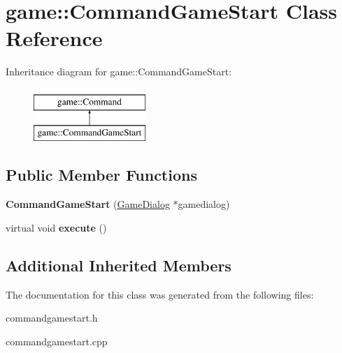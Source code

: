 \hypertarget{classgame_1_1CommandGameStart}{}\section{game\+:\+:Command\+Game\+Start Class Reference}
\label{classgame_1_1CommandGameStart}
Inheritance diagram for game\+:\+:Command\+Game\+Start\+:\begin{figure}[H]
\begin{center}
\leavevmode
\includegraphics[height=2.000000cm]{classgame_1_1CommandGameStart}
\end{center}
\end{figure}
\subsection*{Public Member Functions}
\begin{DoxyCompactItemize}
\item 
\mbox{\label{classgame_1_1CommandGameStart_a206580f2f617c056dd8ed1b3e1717eb4}} 
{\bfseries Command\+Game\+Start} (\hyperlink{classgame_1_1GameDialog}{Game\+Dialog} $\ast$gamedialog)
\item 
\mbox{\label{classgame_1_1CommandGameStart_a129ae7102d5d2ebb84e70ecb5a6ee55c}} 
virtual void {\bfseries execute} ()
\end{DoxyCompactItemize}
\subsection*{Additional Inherited Members}


The documentation for this class was generated from the following files\+:\begin{DoxyCompactItemize}
\item 
commandgamestart.\+h\item 
commandgamestart.\+cpp\end{DoxyCompactItemize}
